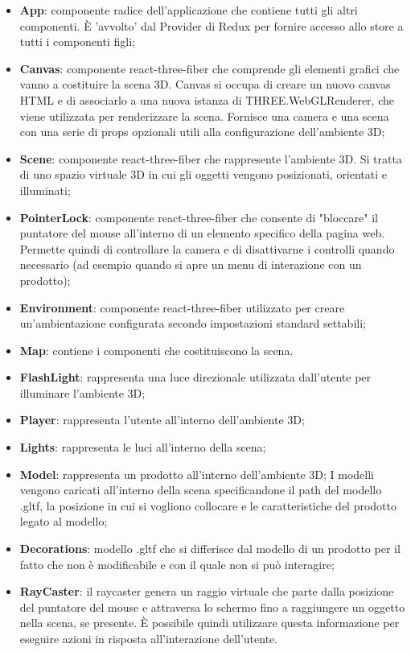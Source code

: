 \begin{itemize}
\begin{itemize}
			\item \textbf{App}: componente radice dell'applicazione che contiene tutti gli altri componenti. 
			È 'avvolto' dal Provider di Redux per fornire accesso allo store a tutti i componenti figli;
			\item \textbf{Canvas}: componente react-three-fiber che comprende gli elementi grafici che vanno a costituire
			la scena 3D.
			Canvas si occupa di creare un nuovo canvas HTML e di associarlo a una nuova istanza di THREE.WebGLRenderer, 
			che viene utilizzata per renderizzare la scena.
			Fornisce una camera e una scena con una serie di props opzionali utili alla configurazione dell'ambiente 3D;
			\item \textbf{Scene}: componente react-three-fiber che rappresente l'ambiente 3D.
			Si tratta di uno spazio virtuale 3D in cui gli oggetti vengono posizionati, orientati e illuminati; 
			\item \textbf{PointerLock}: componente react-three-fiber che consente di "bloccare" il puntatore del mouse all'interno 
			di un elemento specifico della pagina web.
			Permette quindi di controllare la camera e di disattivarne i controlli quando 
			necessario (ad esempio quando si apre un menu di interazione con un prodotto);
			\item \textbf{Environment}: componente react-three-fiber utilizzato per creare un'ambientazione configurata
			secondo impostazioni standard settabili;
			\item \textbf{Map}: contiene i componenti che costituiscono la scena.
			\item \textbf{FlashLight}: rappresenta una luce direzionale utilizzata dall'utente per illuminare
			l'ambiente 3D;
			\item \textbf{Player}: rappresenta l'utente all'interno dell'ambiente 3D;
			\item \textbf{Lights}: rappresenta le luci all'interno della scena;
			\item \textbf{Model}: rappresenta un prodotto all'interno dell'ambiente 3D;
			I modelli vengono caricati all'interno della scena specificandone il path del modello .gltf, la posizione
			in cui si vogliono collocare e le caratteristiche del prodotto legato al modello;
			\item \textbf{Decorations}: modello .gltf che si differisce dal modello di un prodotto 
			per il fatto che non è modificabile e con il quale non si può interagire;
			\item \textbf{RayCaster}: 
			il raycaster genera un raggio virtuale che parte dalla posizione del puntatore del mouse e attraversa lo schermo fino a 
			raggiungere un oggetto nella scena, se presente. 
			È possibile quindi utilizzare questa informazione per eseguire azioni in risposta all'interazione dell'utente.
		\end{itemize}
\end{itemize}
